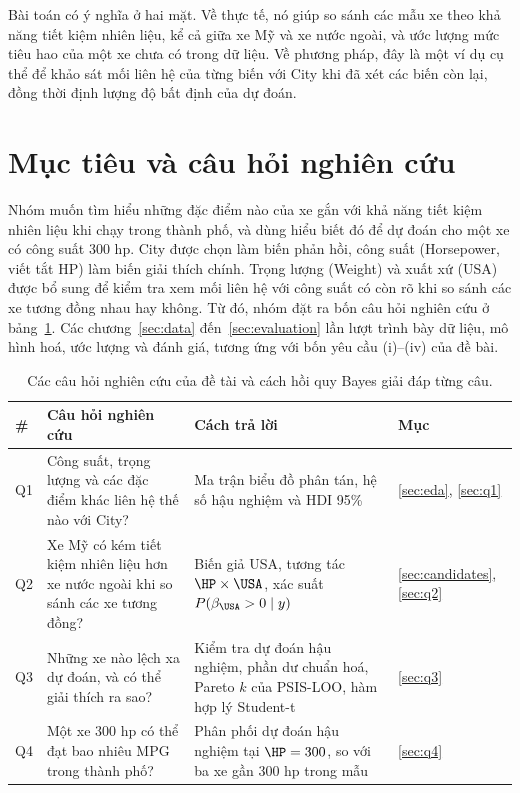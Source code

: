 \documentclass[12pt,a4paper]{report}
\begin{document}
Bài toán có ý nghĩa ở hai mặt. Về thực tế, nó giúp so sánh các mẫu xe theo khả
năng tiết kiệm nhiên liệu, kể cả giữa xe Mỹ và xe nước ngoài, và ước lượng mức
tiêu hao của một xe chưa có trong dữ liệu. Về phương pháp, đây là một ví dụ cụ
thể để khảo sát mối liên hệ của từng biến với City khi đã xét các biến còn
lại, đồng thời định lượng độ bất định của dự đoán.

\section{Mục tiêu và câu hỏi nghiên cứu}

Nhóm muốn tìm hiểu những đặc điểm nào của xe gắn với khả năng tiết kiệm nhiên
liệu khi chạy trong thành phố, và dùng hiểu biết đó để dự đoán cho một xe có
công suất 300 hp. City được chọn làm biến phản hồi, công suất (Horsepower, viết
tắt HP) làm biến giải thích chính. Trọng lượng (Weight) và xuất xứ (USA) được
bổ sung để kiểm tra xem mối liên hệ với công suất có còn rõ khi so sánh các xe
tương đồng nhau hay không. Từ đó, nhóm đặt ra bốn câu hỏi nghiên cứu ở
bảng~\ref{tab:questions}. Các chương~\ref{sec:data} đến~\ref{sec:evaluation}
lần lượt trình bày dữ liệu, mô hình hoá, ước lượng và đánh giá, tương ứng với
bốn yêu cầu (i)--(iv) của đề bài.

\begin{table}[tp]
  \centering
  \caption{Các câu hỏi nghiên cứu của đề tài và cách hồi quy Bayes giải đáp từng câu.}
  \label{tab:questions}
  \begin{tabular}{l>{\raggedright}p{5.2cm}>{\raggedright}p{7.6cm}l}
    \toprule
    \# & Câu hỏi nghiên cứu & Cách trả lời & Mục \\
    \midrule
    Q1 & Công suất, trọng lượng và các đặc điểm khác liên hệ thế nào với City?
       & Ma trận biểu đồ phân tán, hệ số hậu nghiệm và HDI 95\% & \ref{sec:eda}, \ref{sec:q1} \\
    Q2 & Xe Mỹ có kém tiết kiệm nhiên liệu hơn xe nước ngoài khi so sánh các xe tương đồng?
       & Biến giả USA, tương tác $\HP \times \USA$, xác suất $P(\beta_{\USA} > 0 \mid y)$
       & \ref{sec:candidates}, \ref{sec:q2} \\
    Q3 & Những xe nào lệch xa dự đoán, và có thể giải thích ra sao?
       & Kiểm tra dự đoán hậu nghiệm, phần dư chuẩn hoá, Pareto $k$ của PSIS-LOO, hàm hợp lý Student-t
       & \ref{sec:q3} \\
    Q4 & Một xe 300 hp có thể đạt bao nhiêu MPG trong thành phố?
       & Phân phối dự đoán hậu nghiệm tại $\HP = 300$, so với ba xe gần 300 hp trong mẫu
       & \ref{sec:q4} \\
    \bottomrule
  \end{tabular}
\end{table}
\end{document}
